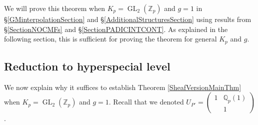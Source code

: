 \documentclass[10pt, oneside]{amsart}
\numberwithin{equation}{subsection}
\theoremstyle{definition}
\theoremstyle{remark}
\newcommand{\mbb}[1]{\mathbb{#1}}
\newcommand{\opn}[1]{\operatorname{#1}}
\newcommand{\tbyt}[4]{\left( \begin{matrix} #1 & #2 \\ #3 & #4 \end{matrix} \right)}
\begin{document}
We will prove this theorem when $K_p = \opn{GL}_2(\mbb{Z}_p)$ and $g=1$ in \S \ref{GMinterpolationSection} and \S \ref{AdditionalStructuresSection} using results from \S \ref{SectionNOCMFs} and \S \ref{SectionPADICINTCONT}. As explained in the following section, this is sufficient for proving the theorem for general $K_p$ and $g$.

\subsection{Reduction to hyperspecial level} \label{RedToHypLevelSSec}

We now explain why it suffices to establish Theorem \ref{SheafVersionMainThm} when $K_p = \opn{GL}_2(\mbb{Z}_p)$ and $g=1$. Recall that we denoted $U_{P'} = \tbyt{1}{\mbb{Q}_p(1)}{}{1}$.
\end{document}
